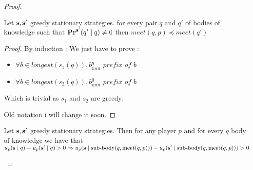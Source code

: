 \begin{proof} 
\begin{mylem}
	\label{lem-meet}
	Let $\mathbf{s}, \mathbf{s}'$ greedy stationary strategies. for every pair $q$ and $q'$ of bodies of knowledge such that $\mathbf{Pr}^{\mathbf{s}'}(q' \mid q) \neq 0$ then $meet(q,p) \preceq meet(q')$
\end{mylem}	
\begin{proof}
By induction : 
We just have to prove : 
\begin{itemize}
	\item $\forall b \in longest(s_1(q)), b^q_{min} \textit{ prefix of } b $
	\item $\forall b \in longest(s_2(q)), b^q_{min} \textit{ prefix of } b $
\end{itemize}
Which is trivial as $s_1$ and $s_2$ are greedy.

Old notation i will change it soon.
\end{proof}
	
\begin{mylem}
	Let $\mathbf{s}, \mathbf{s}'$ greedy stationary strategies. Then for any player $p$ and for every $q$ body of knowledge we have that $u_p(\mathbf{s} \mid q) - u_p(\mathbf{s}' \mid q) > 0 \Rightarrow u_p(\mathbf{s} \mid {\text{\rm sub-body}}(q,\text{\rm meet}(q,p))) - u_p(\mathbf{s}' \mid {\text{\rm sub-body}}(q,\text{\rm meet}(q,p))) > 0$
\end{mylem}


\end{proof}
